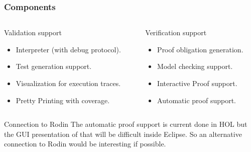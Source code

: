 \documentclass[slidestop,uncompress,mathserif,final]{beamer}
\begin{document}
\begin{frame}
	\frametitle{Components}

	\begin{columns}
	  \begin{column}{.5\textwidth}
			\begin{block}{Validation support}
				{\footnotesize\begin{itemize}
				  \item Interpreter (with debug protocol).
				  \item Test generation support.
				  \item Visualization for execution traces.      
				  \item Pretty Printing with coverage.
				\end{itemize}}
			\end{block}
		  \end{column}
	  \begin{column}{.5\textwidth}
			\begin{block}{Verification support}
				{\footnotesize\begin{itemize}
					\item Proof obligation generation.
					\item Model checking support.
					\item Interactive Proof support.
					\item Automatic proof support.      
				\end{itemize}}
			\end{block}
		  \end{column}
		\end{columns}

  \begin{exampleblock}{Connection to Rodin}
The automatic proof support is current done in HOL but the GUI presentation of that will be difficult inside Eclipse. So an alternative connection to Rodin would be interesting if possible.
  \end{exampleblock}

\end{frame}
\end{document}
